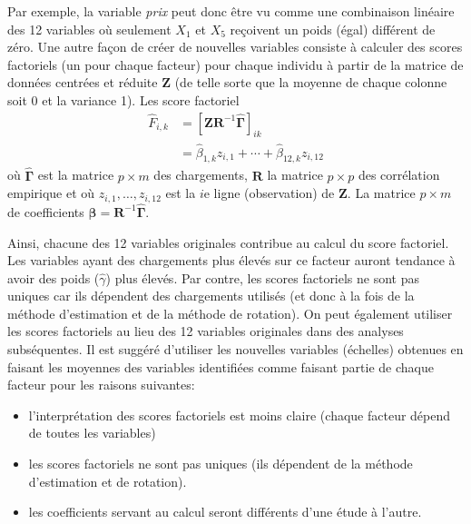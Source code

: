 \documentclass[
  11pt,
  letterpaper,
]{book}
\providecommand{\tightlist}{%
  \setlength{\itemsep}{0pt}\setlength{\parskip}{0pt}}\usepackage{longtable,booktabs,array}
\theoremstyle{definition}
\theoremstyle{remark}
\begin{document}
Par exemple, la variable \emph{prix} peut donc être vu comme une
combinaison linéaire des 12 variables où seulement \(X_1\) et \(X_5\)
reçoivent un poids (égal) différent de zéro. Une autre façon de créer de
nouvelles variables consiste à calculer des scores factoriels (un pour
chaque facteur) pour chaque individu à partir de la matrice de données
centrées et réduite \(\mathbf{Z}\) (de telle sorte que la moyenne de
chaque colonne soit 0 et la variance 1). Les score factoriel
\begin{align*}
\widehat{F}_{i, k} &= \left[\mathbf{Z}\mathbf{R}^{-1}\widehat{\boldsymbol{\Gamma}}\right]_{ik}\\&=
\widehat{\beta}_{1, k} z_{i, 1} + \cdots + \widehat{\beta}_{12, k}z_{i, 12}
\end{align*} où \(\widehat{\boldsymbol{\Gamma}}\) est la matrice
\(p \times m\) des chargements, \(\mathbf{R}\) la matrice \(p \times p\)
des corrélation empirique et où \(z_{i, 1}, \ldots, z_{i, 12}\) est la
\(i\)e ligne (observation) de \(\mathbf{Z}\). La matrice \(p \times m\)
de coefficients
\(\boldsymbol{\beta} = \mathbf{R}^{-1}\widehat{\boldsymbol{\Gamma}}\).

Ainsi, chacune des 12 variables originales contribue au calcul du score
factoriel. Les variables ayant des chargements plus élevés sur ce
facteur auront tendance à avoir des poids (\(\widehat{\gamma}\)) plus
élevés. Par contre, les scores factoriels ne sont pas uniques car ils
dépendent des chargements utilisés (et donc à la fois de la méthode
d'estimation et de la méthode de rotation). On peut également utiliser
les scores factoriels au lieu des 12 variables originales dans des
analyses subséquentes. Il est suggéré d'utiliser les nouvelles variables
(échelles) obtenues en faisant les moyennes des variables identifiées
comme faisant partie de chaque facteur pour les raisons suivantes:

\begin{itemize}
\tightlist
\item
  l'interprétation des scores factoriels est moins claire (chaque
  facteur dépend de toutes les variables)
\item
  les scores factoriels ne sont pas uniques (ils dépendent de la méthode
  d'estimation et de rotation).
\item
  les coefficients servant au calcul seront différents d'une étude à
  l'autre.
\end{itemize}
\end{document}

